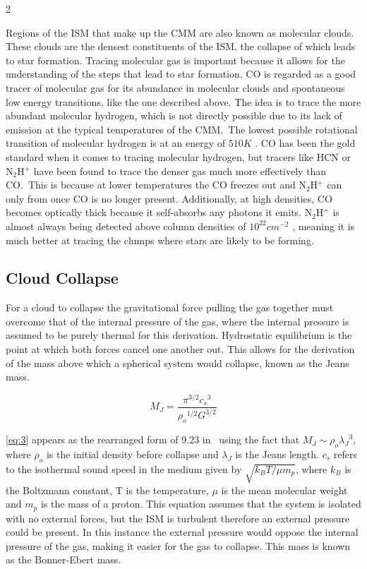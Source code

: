 \documentclass[a4paper,11pt]{article}
\begin{document}
\begin{multicols}{2}
\par\noindent Regions of the ISM that make up the CMM are also known as molecular clouds. These clouds are the densest constituents of the ISM, the collapse of which leads to star formation. Tracing molecular gas is important because it allows for the understanding of the steps that lead to star formation. CO is regarded as a good tracer of molecular gas for its abundance in molecular clouds and spontaneous low energy transitions, like the one described above. The idea is to trace the more abundant molecular hydrogen, which is not directly possible due to its lack of emission at the typical temperatures of the CMM.\ The lowest possible rotational transition of molecular hydrogen is at an energy of $510K$ \parencite{H2_formation}. CO has been the gold standard when it comes to tracing molecular hydrogen, but tracers like HCN or N$_2$H$^+$ have been found to trace the denser gas much more effectively than CO\parencite{N2H_plus}.\ This is because at lower temperatures the CO freezes out and N$_2$H$^+$ can only from once CO is no longer present. Additionally, at high densities, CO becomes optically thick because it self-absorbs any photons it emits. N$_2$H$^+$ is almost always being detected above column densities of $10^{22} cm^{-2}$ \parencite{N2H_plus_density}, meaning it is much better at tracing the clumps where stars are likely to be forming.

\subsection*{Cloud Collapse}

\par\noindent For a cloud to collapse the gravitational force pulling the gas together must overcome that of the internal pressure of the gas, where the internal pressure is assumed to be purely thermal for this derivation. Hydrostatic equilibrium is the point at which both forces cancel one another out. This allows for the derivation of the mass above which a spherical system would collapse, known as the Jeans mass.

\begin{equation}
    M_J = \dfrac{\pi^{3/2}{c_s}^3}{{\rho_o}^{1/2}G^{3/2}}\label{eq:3}
    \tag{3}
\end{equation}

\par\noindent \autoref{eq:3} appears as the rearranged form of 9.23 in\ \cite{SF} using the fact that $M_J \sim \rho_o{\lambda_{J}}^{3}$, where $\rho_o$ is the initial density before collapse and $\lambda_{J}$ is the Jeans length. $c_s$ refers to the isothermal sound speed in the medium given by $\sqrt{k_B T / \mu m_p}$, where $k_B$ is the Boltzmann constant, T is the temperature, $\mu$ is the mean molecular weight and $m_p$ is the mass of a proton. This equation assumes that the system is isolated with no external forces, but the ISM is turbulent therefore an external pressure could be present. In this instance the external pressure would oppose the internal pressure of the gas, making it easier for the gas to collapse. This mass is known as the Bonner-Ebert mass.


\end{multicols}
\end{document}
